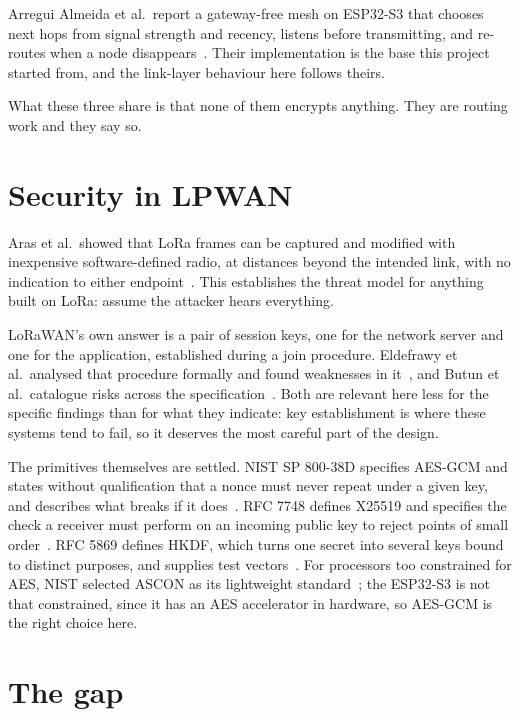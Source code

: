 \documentclass[12pt,a4paper,oneside]{report}
\begin{document}
Arregui Almeida et al.\ report a gateway-free mesh on ESP32-S3 that chooses next
hops from signal strength and recency, listens before transmitting, and re-routes
when a node disappears~\cite{arregui2025gatewayfree}. Their implementation is the
base this project started from, and the link-layer behaviour here follows theirs.

What these three share is that none of them encrypts anything. They are routing
work and they say so.

\section{Security in LPWAN}

Aras et al.\ showed that LoRa frames can be captured and modified with
inexpensive software-defined radio, at distances beyond the intended link, with
no indication to either endpoint~\cite{aras2017exploring}. This establishes the
threat model for anything built on LoRa: assume the attacker hears everything.

LoRaWAN's own answer is a pair of session keys, one for the network server and
one for the application, established during a join procedure. Eldefrawy et al.\
analysed that procedure formally and found weaknesses in
it~\cite{eldefrawy2019formal}, and Butun et al.\ catalogue risks across the
specification~\cite{butun2018lorawan}. Both are relevant here less for the
specific findings than for what they indicate: key establishment is where these
systems tend to fail, so it deserves the most careful part of the design.

The primitives themselves are settled. NIST SP 800-38D specifies AES-GCM and
states without qualification that a nonce must never repeat under a given key,
and describes what breaks if it does~\cite{dworkin2007gcm}. RFC 7748 defines
X25519 and specifies the check a receiver must perform on an incoming public key
to reject points of small order~\cite{rfc7748}. RFC 5869 defines HKDF, which
turns one secret into several keys bound to distinct purposes, and supplies test
vectors~\cite{rfc5869}. For processors too constrained for AES, NIST selected
ASCON as its lightweight standard~\cite{nist2023ascon}; the ESP32-S3 is not that
constrained, since it has an AES accelerator in hardware, so AES-GCM is the right
choice here.

\section{The gap}
\end{document}
